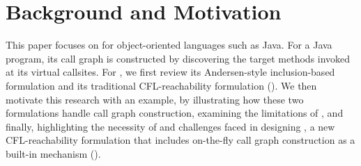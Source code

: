 \section{Background and Motivation}
\label{sec:backgroundAndMotivation}



This paper focuses on  for object-oriented languages such as Java. For
a Java program, its call graph is constructed by discovering
the target methods invoked at  its virtual
callsites. For ,
we first review 
its Andersen-style inclusion-based formulation and  its
 traditional CFL-reachability formulation \manuLFC
().
We then motivate this research with an example, by illustrating how these two
formulations handle call graph
construction, examining the limitations of \manuLFC, and finally, 
highlighting the necessity of and challenges faced in designing \LFCR, a
new CFL-reachability formulation that includes on-the-fly call graph construction
as a built-in mechanism (). 




